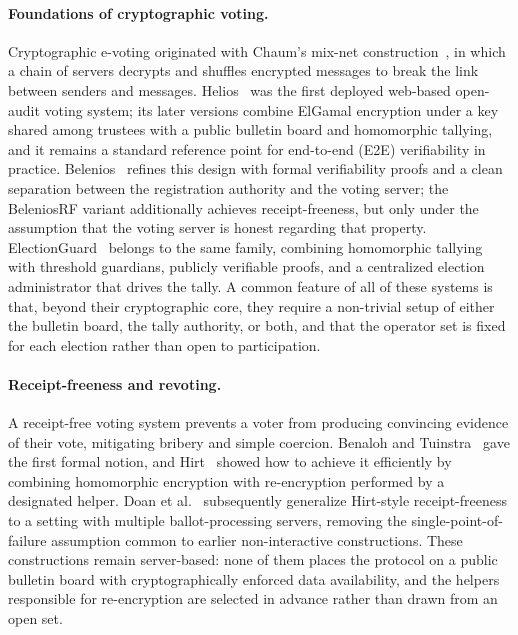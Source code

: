 \paragraph{Foundations of cryptographic voting.}
Cryptographic e-voting originated with Chaum's mix-net construction~\cite{chaum1981}, in which a chain of servers decrypts and shuffles encrypted messages to break the link between senders and messages.
Helios~\cite{helios2008} was the first deployed web-based open-audit voting system; its later versions combine ElGamal encryption under a key shared among trustees with a public bulletin board and homomorphic tallying, and it remains a standard reference point for end-to-end (E2E) verifiability in practice.
Belenios~\cite{belenios2019} refines this design with formal verifiability proofs and a clean separation between the registration authority and the voting server; the BeleniosRF variant additionally achieves receipt-freeness, but only under the assumption that the voting server is honest regarding that property.
ElectionGuard~\cite{electionguard2024} belongs to the same family, combining homomorphic tallying with threshold guardians, publicly verifiable proofs, and a centralized election administrator that drives the tally. A common feature of all of these systems is that, beyond their cryptographic core, they require a non-trivial setup of either the bulletin board, the tally authority, or both, and that the operator set is fixed for each election rather than open to participation.

\paragraph{Receipt-freeness and revoting.}
A receipt-free voting system prevents a voter from producing convincing evidence of their vote, mitigating bribery and simple coercion. Benaloh and Tuinstra~\cite{benaloh1994} gave the first formal notion, and Hirt~\cite{hirt2000} showed how to achieve it efficiently by combining homomorphic encryption with re-encryption performed by a designated helper.
Doan et al.~\cite{doan2024} subsequently generalize Hirt-style receipt-freeness to a setting with multiple ballot-processing servers, removing the single-point-of-failure assumption common to earlier non-interactive constructions.
These constructions remain server-based: none of them places the protocol on a public bulletin board with cryptographically enforced data availability, and the helpers responsible for re-encryption are selected in advance rather than drawn from an open set.


